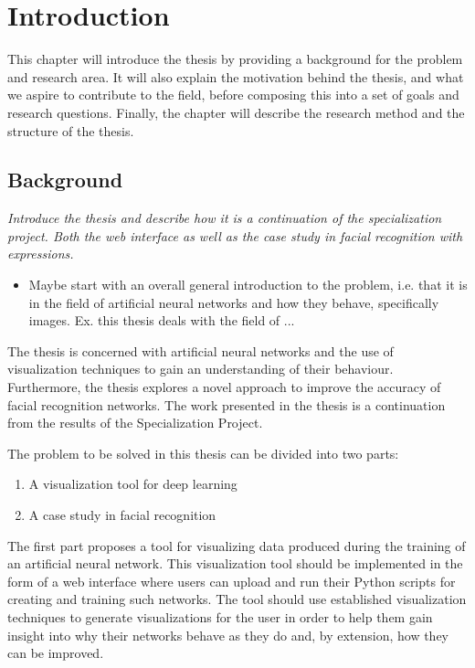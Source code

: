 \chapter{Introduction}

This chapter will introduce the thesis by providing a background for the problem and research area. It will also explain the motivation behind the thesis, and what we aspire to contribute to the field, before composing this into a set of goals and research questions. Finally, the chapter will describe the research method and the structure of the thesis.

\section{Background}

\textit{Introduce the thesis and describe how it is a continuation of the specialization project. Both the web interface as well as the case study in facial recognition with expressions.}

\begin{itemize}
    \item Maybe start with an overall general introduction to the problem, i.e. that it is in the field of artificial neural networks and how they behave, specifically images. Ex. this thesis deals with the field of ...
\end{itemize}

The thesis is concerned with artificial neural networks and the use of visualization techniques to gain an understanding of their behaviour. Furthermore, the thesis explores a novel approach to improve the accuracy of facial recognition networks. The work presented in the thesis is a continuation from the results of the Specialization Project. 

\noindent The problem to be solved in this thesis can be divided into two parts:
\begin{enumerate}
    \item A visualization tool for deep learning
    \item A case study in facial recognition
\end{enumerate}

\noindent The first part proposes a tool for visualizing data produced during the training of an artificial neural network. This visualization tool should be implemented in the form of a web interface where users can upload and run their Python scripts for creating and training such networks. The tool should use established visualization techniques to generate visualizations for the user in order to help them gain insight into why their networks behave as they do and, by extension, how they can be improved. \\

